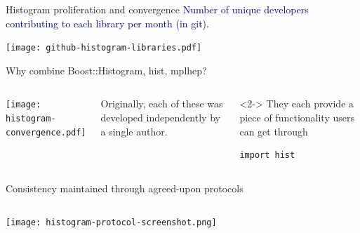 \begin{frame}{Histogram proliferation and convergence}
\vspace{0.25 cm}
\textcolor{darkblue}{Number of unique developers contributing to each library per month (in git).}

\texttt{[image: github-histogram-libraries.pdf]}
\end{frame}

\begin{frame}[fragile]{Why combine Boost::Histogram, hist, mplhep?}
\vspace{0.5 cm}
\begin{columns}
\texttt{[image: histogram-convergence.pdf]}

Originally, each of these was developed independently by a single author.

\vspace{0.75 cm}
\begin{uncoverenv}<2->
They each provide a piece of functionality users can get through

\begin{verbatim}
import hist
\end{verbatim}
\end{uncoverenv}

\vspace{0.75 cm}
\end{columns}
\end{frame}

\begin{frame}{Consistency maintained through agreed-upon protocols}
\vspace{0.5 cm}
\begin{columns}
\texttt{[image: histogram-protocol-screenshot.png]}
\end{columns}
\end{frame}

